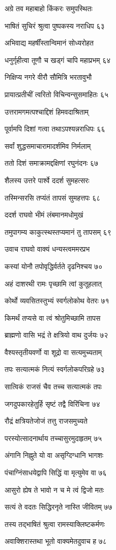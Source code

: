 अग्रे तव महाबाहो किंकरः समुपस्थितः

भाषितं सुचिरं श्रुत्वा पुष्पकस्य नराधिप ६३

अभिवाद्य महर्षींस्तान्विमानं सोध्यरोहत

धनुर्गृहीत्वा तूणौ च खड्गं चापि महाप्रभम् ६४

निक्षिप्य नगरे वीरौ सौमित्रि भरतावुभौ

प्रायात्प्रतीचीं त्वरितो विचिन्वन्सुसमाहितः ६५

उत्तरामगमत्पश्चाद्दिशं हिमवदाश्रिताम्

पूर्वामपि दिशां गत्वा तथाऽपश्यन्नराधिपः ६६

सर्वां शुद्धसमाचारामादर्शमिव निर्मलाम्

ततो दिशं समाक्रामद्दक्षिणां रघुनंदनः ६७

शैलस्य उत्तरे पार्श्वे ददर्श सुमहत्सरः

तस्मिन्सरसि तप्यंतं तापसं सुमहत्तपः ६८

ददर्श राघवो भीमं लंबमानमधोमुखं

तमुपागम्य काकुत्स्थस्तप्यमानं तु तापसम् ६९

उवाच राघवो वाक्यं धन्यस्त्वममरप्रभ

कस्यां योनौ तपोवृद्धिर्वर्तते दृढनिश्चय ७०

अहं दाशरथी रामः पृच्छामि त्वां कुतूहलात्

कोर्थो व्यवसितस्तुभ्यं स्वर्गलोकोथ वेतरः ७१

किमर्थं तप्यसे वा त्वं श्रोतुमिच्छामि तापस

ब्राह्मणो वासि भद्रं ते क्षत्रियो वाथ दुर्जयः ७२

वैश्यस्तृतीयवर्णो वा शूद्रो वा सत्यमुच्यताम्

तपः सत्यात्मकं नित्यं स्वर्गलोकपरिग्रहे ७३

सात्विकं राजसं चैव तच्च सत्यात्मकं तपः

जगदुपकारहेतुर्हि सृष्टं तद्वै विरिंचिना ७४

रौद्रं क्षत्रियतेजोजं तत्तु राजसमुच्यते

परस्योत्सादनार्थाय तच्चासुरमुदाहृतम् ७५

अंगानि निह्नुते यो वा असृग्दिग्धानि भागशः

पंचाग्निंसाधयेद्वापि सिद्धिं वा मृत्युमेव वा ७६

आसुरो ह्येष ते भावो न च मे त्वं द्विजो मतः

सत्यं ते वदतः सिद्धिरनृते नास्ति जीवितम् ७७

तस्य तद्भाषितं श्रुत्वा रामस्याक्लिष्टकर्मणः

अवाक्शिरास्तथा भूतो वाक्यमेतदुवाच ह ७८

